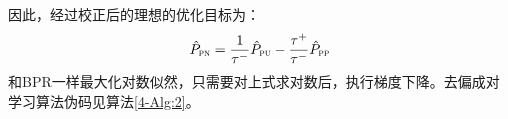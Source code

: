 因此，经过校正后的理想的优化目标为：
\[\hat{P}_\textsc{pn} = \frac{1}{\tau^-}
\hat{P}_\textsc{pu} - \frac{\tau^+}{\tau^-}\hat{P}_\textsc{pp} \]
和BPR一样最大化对数似然，只需要对上式求对数后，执行梯度下降。去偏成对学习算法伪码见算法\ref{4-Alg:2}。

